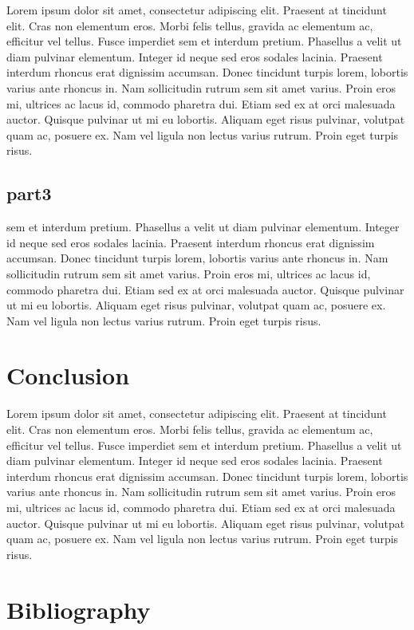 \documentclass[12pt]{article}
\begin{document}
	Lorem ipsum dolor sit amet, consectetur adipiscing elit. Praesent at tincidunt elit. Cras non elementum eros. Morbi felis tellus, gravida ac elementum ac, efficitur vel tellus. Fusce imperdiet sem et interdum pretium. Phasellus a velit ut diam pulvinar elementum. Integer id neque sed eros sodales lacinia. Praesent interdum rhoncus erat dignissim accumsan. Donec tincidunt turpis lorem, lobortis varius ante rhoncus in. Nam sollicitudin rutrum sem sit amet varius. Proin eros mi, ultrices ac lacus id, commodo pharetra dui. Etiam sed ex at orci malesuada auctor. Quisque pulvinar ut mi eu lobortis. Aliquam eget risus pulvinar, volutpat quam ac, posuere ex. Nam vel ligula non lectus varius rutrum. Proin eget turpis risus.
	
	
	
	
	\subsection{part3}
	
	sem et interdum pretium. Phasellus a velit ut diam pulvinar elementum. Integer id neque sed eros sodales lacinia. Praesent interdum rhoncus erat dignissim accumsan. Donec tincidunt turpis lorem, lobortis varius ante rhoncus in. Nam sollicitudin rutrum sem sit amet varius. Proin eros mi, ultrices ac lacus id, commodo pharetra dui. Etiam sed ex at orci malesuada auctor. Quisque pulvinar ut mi eu lobortis. Aliquam eget risus pulvinar, volutpat quam ac, posuere ex. Nam vel ligula non lectus varius rutrum. Proin eget turpis risus.
	
	
	\section{Conclusion}
	
	Lorem ipsum dolor sit amet, consectetur adipiscing elit. Praesent at tincidunt elit. Cras non elementum eros. Morbi felis tellus, gravida ac elementum ac, efficitur vel tellus. Fusce imperdiet sem et interdum pretium. Phasellus a velit ut diam pulvinar elementum. Integer id neque sed eros sodales lacinia. Praesent interdum rhoncus erat dignissim accumsan. Donec tincidunt turpis lorem, lobortis varius ante rhoncus in. Nam sollicitudin rutrum sem sit amet varius. Proin eros mi, ultrices ac lacus id, commodo pharetra dui. Etiam sed ex at orci malesuada auctor. Quisque pulvinar ut mi eu lobortis. Aliquam eget risus pulvinar, volutpat quam ac, posuere ex. Nam vel ligula non lectus varius rutrum. Proin eget turpis risus.
	
	\section{Bibliography}%
	
	
\end{document}
